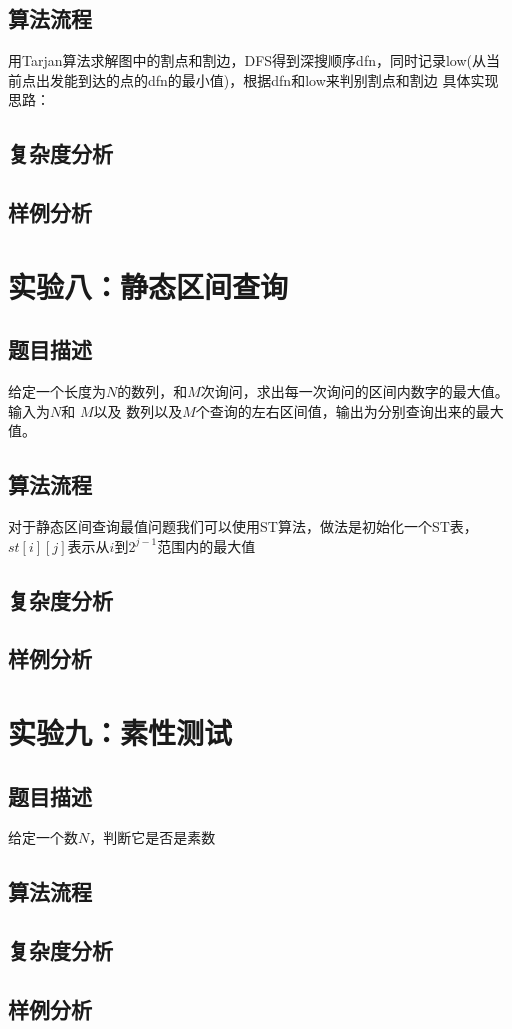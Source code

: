 \documentclass[UTF8,a4paperdui, %
]{ctexart}
\begin{document}
\subsection{算法流程}
用Tarjan算法求解图中的割点和割边，DFS得到深搜顺序dfn，同时记录low(从当前点出发能到达的点的dfn的最小值)，根据dfn和low来判别割点和割边
具体实现思路：

\subsection{复杂度分析}

\subsection{样例分析}

\newpage
\section{实验八：静态区间查询}

\subsection{题目描述}
给定一个长度为$N$的数列，和$M$次询问，求出每一次询问的区间内数字的最大值。输入为$N$和 $M$以及
数列以及$M$个查询的左右区间值，输出为分别查询出来的最大值。

\subsection{算法流程}
对于静态区间查询最值问题我们可以使用ST算法，做法是初始化一个ST表，$st[i][j]$表示从$i$到$2^{j-1}$范围内的最大值
\subsection{复杂度分析}

\subsection{样例分析}

\newpage
\section{实验九：素性测试}

\subsection{题目描述}
给定一个数$N$，判断它是否是素数
\subsection{算法流程}

\subsection{复杂度分析}

\subsection{样例分析}
\end{document}
